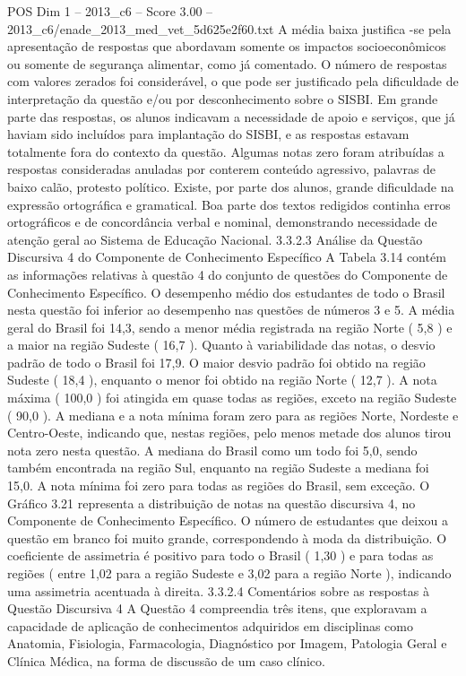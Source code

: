 \begin{textsample}{POS Dim 1 – 2013\_c6 – Score 3.00 – 2013\_c6/enade\_2013\_med\_vet\_5d625e2f60.txt}
A média baixa justifica -se pela apresentação de respostas que abordavam somente os impactos socioeconômicos ou somente de segurança alimentar, como já comentado.
O número de respostas com valores zerados foi considerável, o que pode ser justificado pela dificuldade de interpretação da questão e/ou por desconhecimento sobre o SISBI.
Em grande parte das respostas, os alunos indicavam a necessidade de apoio e serviços, que já haviam sido incluídos para implantação do SISBI, e as respostas estavam totalmente fora do contexto da questão.
Algumas notas zero foram atribuídas a respostas consideradas anuladas por conterem conteúdo agressivo, palavras de baixo calão, protesto político.
Existe, por parte dos alunos, grande dificuldade na expressão ortográfica e gramatical.
Boa parte dos textos redigidos continha erros ortográficos e de concordância verbal e nominal, demonstrando necessidade de atenção geral ao Sistema de Educação Nacional. 3.3.2.3 Análise da Questão Discursiva 4 do Componente de Conhecimento Específico A Tabela 3.14 contém as informações relativas à questão 4 do conjunto de questões do Componente de Conhecimento Específico.
O desempenho médio dos estudantes de todo o Brasil nesta questão foi inferior ao desempenho nas questões de números 3 e 5.
A média geral do Brasil foi 14,3, sendo a menor média registrada na região Norte ( 5,8 ) e a maior na região Sudeste ( 16,7 ).
Quanto à variabilidade das notas, o desvio padrão de todo o Brasil foi 17,9.
O maior desvio padrão foi obtido na região Sudeste ( 18,4 ), enquanto o menor foi obtido na região Norte ( 12,7 ).
A nota máxima ( 100,0 ) foi atingida em quase todas as regiões, exceto na região Sudeste ( 90,0 ).
A mediana e a nota mínima foram zero para as regiões Norte, Nordeste e Centro-Oeste, indicando que, nestas regiões, pelo menos metade dos alunos tirou nota zero nesta questão.
A mediana do Brasil como um todo foi 5,0, sendo também encontrada na região Sul, enquanto na região Sudeste a mediana foi 15,0.
A nota mínima foi zero para todas as regiões do Brasil, sem exceção.
O Gráfico 3.21 representa a distribuição de notas na questão discursiva 4, no Componente de Conhecimento Específico.
O número de estudantes que deixou a questão em branco foi muito grande, correspondendo à moda da distribuição.
O coeficiente de assimetria é positivo para todo o Brasil ( 1,30 ) e para todas as regiões ( entre 1,02 para a região Sudeste e 3,02 para a região Norte ), indicando uma assimetria acentuada à direita. 3.3.2.4 Comentários sobre as respostas à Questão Discursiva 4 A Questão 4 compreendia três itens, que exploravam a capacidade de aplicação de conhecimentos adquiridos em disciplinas como Anatomia, Fisiologia, Farmacologia, Diagnóstico por Imagem, Patologia Geral e Clínica Médica, na forma de discussão de um caso clínico.

\end{textsample}

